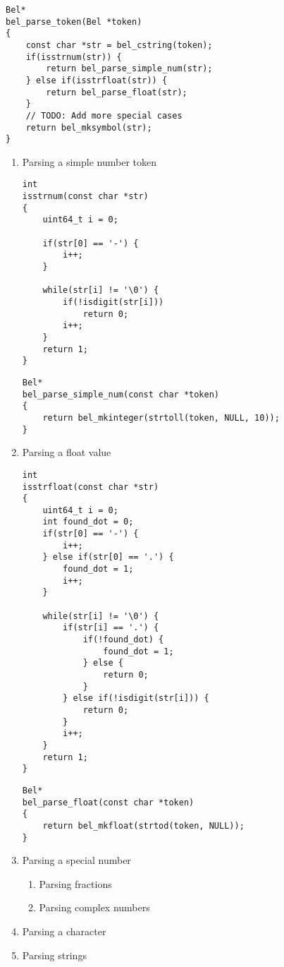 \documentclass[openright,a4paper,twoside,12pt]{memoir}
\begin{document}
\begin{verbatim}
Bel*
bel_parse_token(Bel *token)
{
    const char *str = bel_cstring(token);
    if(isstrnum(str)) {
        return bel_parse_simple_num(str);
    } else if(isstrfloat(str)) {
        return bel_parse_float(str);
    }
    // TODO: Add more special cases
    return bel_mksymbol(str);
}
\end{verbatim}

\begin{enumerate}
\item Parsing a simple number token
\label{sec:org1ab25a5}

\begin{verbatim}
int
isstrnum(const char *str)
{
    uint64_t i = 0;

    if(str[0] == '-') {
        i++;
    }

    while(str[i] != '\0') {
        if(!isdigit(str[i]))
            return 0;
        i++;
    }
    return 1;
}
\end{verbatim}

\begin{verbatim}
Bel*
bel_parse_simple_num(const char *token)
{
    return bel_mkinteger(strtoll(token, NULL, 10));
}
\end{verbatim}

\item Parsing a float value
\label{sec:org59d3939}

\begin{verbatim}
int
isstrfloat(const char *str)
{
    uint64_t i = 0;
    int found_dot = 0;
    if(str[0] == '-') {
        i++;
    } else if(str[0] == '.') {
        found_dot = 1;
        i++;
    }

    while(str[i] != '\0') {
        if(str[i] == '.') {
            if(!found_dot) {
                found_dot = 1;
            } else {
                return 0;
            }
        } else if(!isdigit(str[i])) {
            return 0;
        }
        i++;
    }
    return 1;
}
\end{verbatim}

\begin{verbatim}
Bel*
bel_parse_float(const char *token)
{
    return bel_mkfloat(strtod(token, NULL));
}
\end{verbatim}

\item Parsing a special number
\label{sec:org530a5d3}

\begin{enumerate}
\item Parsing fractions
\label{sec:orgee4eef2}

\item Parsing complex numbers
\label{sec:orgcfb3628}
\end{enumerate}

\item Parsing a character
\label{sec:orgbd0c4c4}

\item Parsing strings
\label{sec:orgf52a895}
\end{enumerate}
\end{document}

